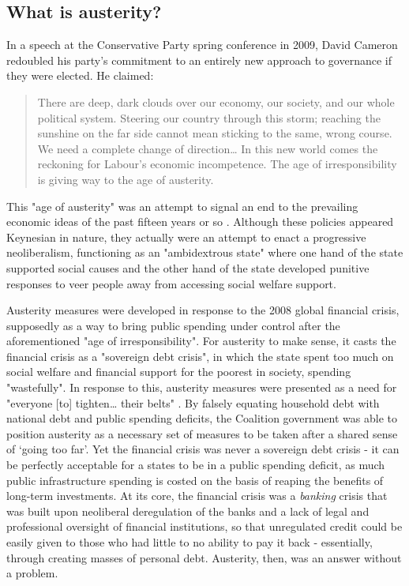 \subsection{What is austerity?}
\label{subsec:what-is-austerity}

In a speech at the Conservative Party spring conference in 2009, David Cameron redoubled his party's commitment to an entirely new approach to governance if they were elected. He claimed:

\begin{quote}
There are deep, dark clouds over our economy, our society, and our whole political system. Steering our country through this storm; reaching the sunshine on the far side cannot mean sticking to the same, wrong course. We need a complete change of direction\ldots{} In this new world comes the reckoning for Labour's economic incompetence. The age of irresponsibility is giving way to the age of austerity. \citep{cameron_age_2009}
\end{quote}

This "age of austerity" was an attempt to signal an end to the prevailing economic ideas of the past fifteen years or so \citep{blyth_austerity_2013}. Although these policies appeared Keynesian in nature, they actually were an attempt to enact a progressive neoliberalism, functioning as an "ambidextrous state" \citep[p. 104]{peck_zombie_2010} where one hand of the state supported social causes and the other  hand of the state developed punitive responses to veer people away from accessing social welfare support.

Austerity measures were developed in response to the 2008 global financial crisis, supposedly as a way to bring public spending under control after the aforementioned "age of irresponsibility". For austerity to make sense, it casts the financial crisis as a "sovereign debt crisis", in which the state spent too much on social welfare and financial support for the poorest in society, spending "wastefully". In response to this, austerity measures were presented as a need for "everyone [to] tighten\ldots{} their belts" \citep[p. 13]{blyth_austerity_2013}. By falsely equating household debt with national debt and public spending deficits, the Coalition government was able to position austerity as a necessary set of measures to be taken after a shared sense of `going too far'. Yet the financial crisis was never a sovereign debt crisis - it can be perfectly acceptable for a states to be in a public spending deficit, as much public infrastructure spending is costed on the basis of reaping the benefits of long-term investments. At its core, the financial crisis was a \textit{banking} crisis that was built upon neoliberal deregulation of the banks and a lack of legal and professional oversight of financial institutions, so that unregulated credit could be easily given to those who had little to no ability to pay it back - essentially, through creating masses of personal debt. Austerity, then, was an answer without a problem.

